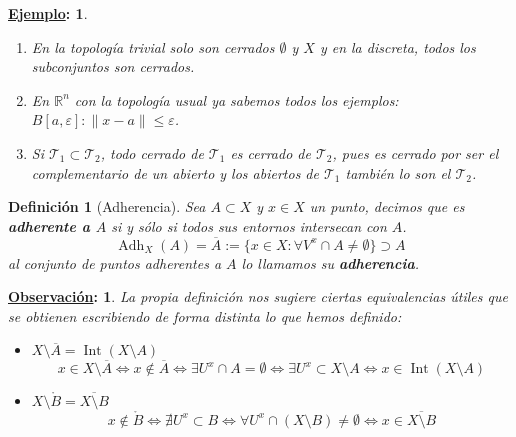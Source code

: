 \documentclass[10pt,a4paper,openright]{book}
\theoremstyle{break}
\newtheorem*{defi}{Definición}
\newtheorem*{obs}{\underline{Observación}:}
\newtheorem*{ej}{\underline{Ejemplo}:}
\DeclareMathOperator{\inter}{Int}
\DeclareMathOperator{\adh}{Adh}
\begin{document}
\begin{ej}
\begin{enumerate}
    \item En la topología trivial solo son cerrados $\emptyset$ y $X$ y en la discreta, todos los subconjuntos son cerrados.
    \item En $\mathbb{R}^n$ con la topología usual ya sabemos todos los ejemplos: $B\left[ a, \varepsilon \right] : \lVert x - a \rVert \le \varepsilon$.
    \item Si $\mathcal{T}_1 \subset \mathcal{T}_2$, todo cerrado de $\mathcal{T}_1$ es cerrado de $\mathcal{T}_2$, pues es cerrado por ser el complementario de un abierto y los abiertos de $\mathcal{T}_1$ también lo son el $\mathcal{T}_2$.
\end{enumerate}
\end{ej}

\begin{defi}[Adherencia]
Sea $A \subset X$ y $x\in X$ un punto, decimos que es \textbf{adherente a $A$} si y sólo si todos sus entornos intersecan con $A$.
$$
\adh_X\left( A \right) = \overline{A} := \{x \in X: \forall V^x \cap A \neq \emptyset\} \supset A
$$
al conjunto de puntos adherentes a $A$ lo llamamos su \textbf{adherencia}.
\end{defi}

\begin{obs}
La propia definición nos sugiere ciertas equivalencias útiles que se obtienen escribiendo de forma distinta lo que hemos definido:
\begin{itemize}
\item $X \setminus \overline{A} = \inter\left( X \setminus A \right)$
$$
x \in X \setminus \overline{A} \Leftrightarrow x \not\in \overline{A} \Leftrightarrow \exists U^x \cap A = \emptyset \Leftrightarrow \exists U^x \subset X \setminus A \Leftrightarrow x \in \inter\left( X \setminus A \right)
$$
\item $X \setminus \mathring{B} = \overline{X \setminus B}$
$$
x \not\in \mathring{B} \Leftrightarrow \nexists U^x \subset B \Leftrightarrow \forall U^x \cap \left( X \setminus B \right) \neq \emptyset \Leftrightarrow x \in \overline{X \setminus B}
$$
\end{itemize}
\end{obs}
\end{document}
